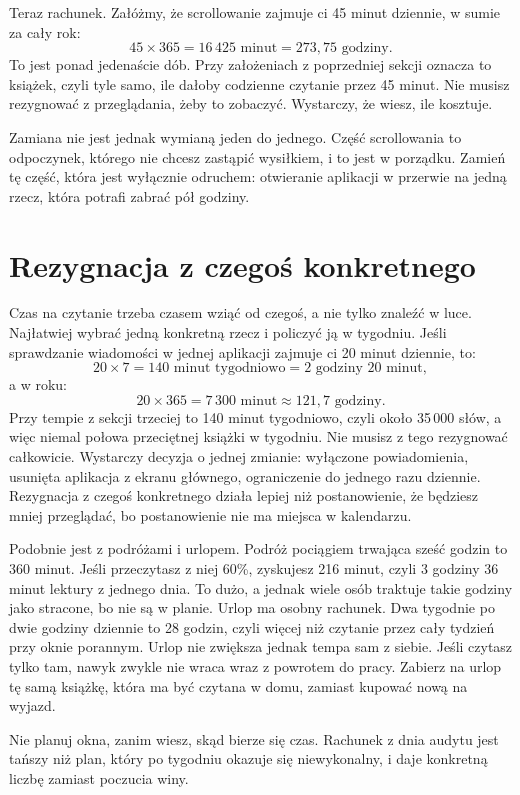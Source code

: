 Teraz rachunek. Załóżmy, że scrollowanie zajmuje ci 45 minut dziennie, w sumie za cały rok:
\[ 45 \times 365 = 16\,425 \text{ minut} = 273{,}75 \text{ godziny}. \]
To jest ponad jedenaście dób. Przy założeniach z poprzedniej sekcji oznacza to
 książek, czyli tyle samo, ile dałoby codzienne czytanie przez 45 minut.
Nie musisz rezygnować z przeglądania, żeby to zobaczyć. Wystarczy, że wiesz, ile kosztuje.

Zamiana nie jest jednak wymianą jeden do jednego. Część scrollowania to odpoczynek, którego
nie chcesz zastąpić wysiłkiem, i to jest w porządku. Zamień tę część, która jest wyłącznie
odruchem: otwieranie aplikacji w przerwie na jedną rzecz, która potrafi zabrać pół godziny.

\section{Rezygnacja z czegoś konkretnego}

Czas na czytanie trzeba czasem wziąć od czegoś, a nie tylko znaleźć w luce. Najłatwiej wybrać
jedną konkretną rzecz i policzyć ją w tygodniu. Jeśli sprawdzanie wiadomości w jednej aplikacji
zajmuje ci 20 minut dziennie, to:
\[ 20 \times 7 = 140 \text{ minut tygodniowo} = 2 \text{ godziny } 20 \text{ minut}, \]
a w roku:
\[ 20 \times 365 = 7\,300 \text{ minut} \approx 121{,}7 \text{ godziny}. \]
Przy tempie z sekcji trzeciej to 140 minut tygodniowo, czyli około 35\,000 słów, a więc niemal
połowa przeciętnej książki w tygodniu. Nie musisz z tego rezygnować całkowicie. Wystarczy
decyzja o jednej zmianie: wyłączone powiadomienia, usunięta aplikacja z ekranu głównego, ograniczenie
do jednego razu dziennie. Rezygnacja z czegoś konkretnego działa lepiej niż postanowienie, że
będziesz mniej przeglądać, bo postanowienie nie ma miejsca w kalendarzu.

Podobnie jest z podróżami i urlopem. Podróż pociągiem trwająca sześć godzin to 360 minut. Jeśli
przeczytasz z niej 60\%, zyskujesz 216 minut, czyli 3 godziny 36 minut lektury z jednego dnia.
To dużo, a jednak wiele osób traktuje takie godziny jako stracone, bo nie są w planie. Urlop
ma osobny rachunek. Dwa tygodnie po dwie godziny dziennie to 28 godzin, czyli więcej niż
czytanie przez cały tydzień przy oknie porannym. Urlop nie zwiększa jednak tempa sam z siebie.
Jeśli czytasz tylko tam, nawyk zwykle nie wraca wraz z powrotem do pracy. Zabierz na urlop tę
samą książkę, która ma być czytana w domu, zamiast kupować nową na wyjazd.

\begin{zasada}
Nie planuj okna, zanim wiesz, skąd bierze się czas. Rachunek z dnia audytu jest tańszy niż
plan, który po tygodniu okazuje się niewykonalny, i daje konkretną liczbę zamiast poczucia winy.
\end{zasada}

